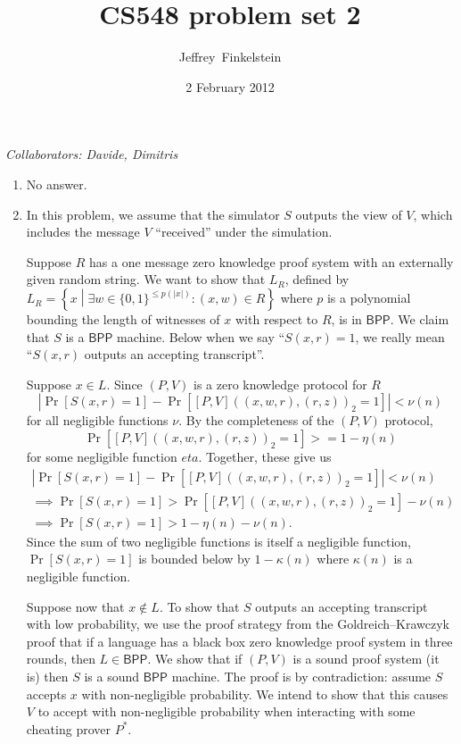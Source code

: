 \documentclass{article}
\author{Jef{}frey~Finkelstein}
\date{2 February 2012}
\title{CS548 problem set 2}
\newcommand{\collaborators}[1]{\emph{Collaborators: #1}}
\newcommand{\BPP}{\mathsf{BPP}}
\begin{document}
\maketitle
\collaborators{Davide, Dimitris}
\begin{enumerate}
\item No answer.
\item
  In this problem, we assume that the simulator $S$ outputs the view of $V$, which includes the message $V$ ``received'' under the simulation.

  Suppose $R$ has a one message zero knowledge proof system with an externally given random string.
  We want to show that $L_R$, defined by $L_R=\left\{ x \middle| \exists w\in\{0, 1\}^{\leq p(|x|)}\colon (x, w)\in R \right\}$ where $p$ is a polynomial bounding the length of witnesses of $x$ with respect to $R$, is in $\BPP$.
  We claim that $S$ is a $\BPP$ machine.
  Below when we say ``$S(x, r)=1$, we really mean ``$S(x, r)$ outputs an accepting transcript''.

  Suppose $x\in L$.
  Since $(P, V)$ is a zero knowledge protocol for $R$
  \begin{displaymath}
    \left|\Pr\left[S(x,r)=1\right] - \Pr\left[[P,V]((x, w, r), (r, z))_2=1\right]\right| < \nu(n)
  \end{displaymath}
  for all negligible functions $\nu$.
  By the completeness of the $(P, V)$ protocol,
  \begin{displaymath}
    \Pr\left[[P, V]((x, w, r), (r, z))_2 = 1\right] >= 1 - \eta(n)
  \end{displaymath}
  for some negligible function $eta$.
  Together, these give us
  \begin{align*}
    \left|\Pr\left[S(x,r)=1\right] - \Pr\left[[P,V]((x, w, r), (r, z))_2=1\right]\right| < \nu(n) \\
    \implies \Pr\left[S(x,r)=1\right] > \Pr\left[[P,V]((x, w, r), (r, z))_2=1\right] - \nu(n) \\
    \implies \Pr\left[S(x,r)=1\right] > 1 - \eta(n) - \nu(n).
  \end{align*}
  Since the sum of two negligible functions is itself a negligible function, $\Pr[S(x,r)=1]$ is bounded below by $1-\kappa(n)$ where $\kappa(n)$ is a negligible function.

  Suppose now that $x\notin L$.
  To show that $S$ outputs an accepting transcript with low probability, we use the proof strategy from the Goldreich--Krawczyk proof that if a language has a black box zero knowledge proof system in three rounds, then $L\in\BPP$.
  We show that if $(P, V)$ is a sound proof system (it is) then $S$ is a sound $\BPP$ machine.
  The proof is by contradiction: assume $S$ accepts $x$ with non-negligible probability.
  We intend to show that this causes $V$ to accept with non-negligible probability when interacting with some cheating prover $P^*$.


\end{enumerate}
\end{document}
